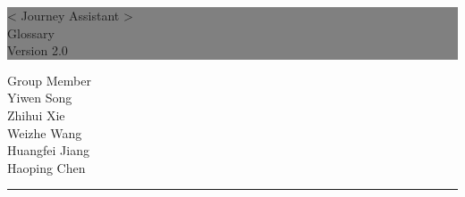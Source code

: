 \documentclass[10pt]{article}
\begin{document}

\begin{titlepage} %
	
	
	\colorbox{grey}{
		\parbox[t]{1.1\textwidth}{ %
			\parbox[t]{1.02\textwidth}{ %
				\raggedleft %
				\fontsize{34pt}{40pt}\selectfont %
				\vspace{0.7cm} %
				
				< Journey Assistant >\\
                Glossary\\
                Version 2.0\\
				
				\vspace{0.7cm} %
			}
		}
	}
	
	\vfill %
	
	
	\parbox[t]{1\textwidth}{ %
		\raggedleft %
		\large %
		{\Large Group Member}\\[4pt] %
        Yiwen Song\\
        Zhihui Xie\\
        Weizhe Wang\\
        Huangfei Jiang\\
        Haoping Chen\\
		
		\hfill\rule{0.2\linewidth}{1pt}%
    }
    
	
\end{titlepage}
\end{document}
